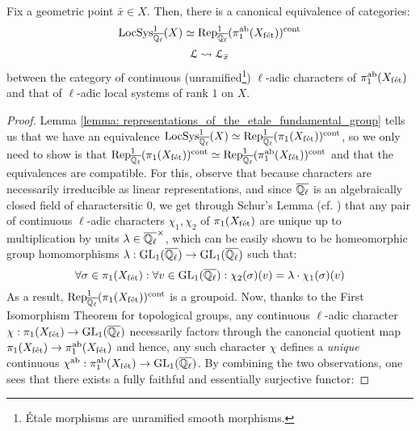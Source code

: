         \begin{theorem} \label{theorem: unramified_representations_are_sheaves_on_X}
            Fix a geometric point $\bar{x} \in X$. Then, there is a canonical equivalence of categories:
                $$\mathrm{LocSys}^1_{\overline{\mathbb{Q}_{\ell}}}(X) \simeq \mathrm{Rep}^1_{\overline{\mathbb{Q}_{\ell}}}(\pi_1^{\mathrm{ab}}(X_{\mathrm{f\acute{e}t}}))^{\mathrm{cont}}$$
                $$\mathcal{L} \leadsto \mathcal{L}_{\bar{x}}$$
            between the category of continuous (unramified\footnote{\'Etale morphisms are unramified smooth morphisms.}) $\ell$-adic characters of $\pi_1^{\mathrm{ab}}(X_{\mathrm{f\acute{e}t}})$ and that of $\ell$-adic local systems of rank $1$ on $X$.
        \end{theorem}
            \begin{proof}
                Lemma \ref{lemma: representations_of_the_etale_fundamental_group} tells us that we have an equivalence $\mathrm{LocSys}^1_{\overline{\mathbb{Q}_{\ell}}}(X) \simeq \mathrm{Rep}^1_{\overline{\mathbb{Q}_{\ell}}}(\pi_1(X_{\mathrm{f\acute{e}t}}))^{\mathrm{cont}}$, so we only need to show is that $\mathrm{Rep}^1_{\overline{\mathbb{Q}_{\ell}}}(\pi_1(X_{\mathrm{f\acute{e}t}}))^{\mathrm{cont}} \simeq \mathrm{Rep}^1_{\overline{\mathbb{Q}_{\ell}}}(\pi_1^{\mathrm{ab}}(X_{\mathrm{f\acute{e}t}}))^{\mathrm{cont}}$ and that the equivalences are compatible. For this, observe that because characters are necessarily irreducible as linear representations, and since $\overline{\mathbb{Q}_{\ell}}$ is an algebraically closed field of charactersitic $0$, we get through Schur's Lemma (cf. \cite[Lemma 3.6, pp. 35]{lam_first_course_in_noncommutative_rings}) that any pair of continuous $\ell$-adic characters $\chi_1, \chi_2$ of $\pi_1(X_{\mathrm{f\acute{e}t}})$ are unique up to multiplication by units $\lambda \in \overline{\Q_{\ell}}^{\x}$, which can be easily shown to be homeomorphic group homomorphisms $\lambda: \operatorname{GL}_1(\overline{\mathbb{Q}_{\ell}}) \to \operatorname{GL}_1(\overline{\mathbb{Q}_{\ell}})$ such that:
                    $$\forall \sigma \in \pi_1(X_{\mathrm{f\acute{e}t}}): \forall v \in \operatorname{GL}_1(\overline{\mathbb{Q}_{\ell}}): \chi_2(\sigma)(v) = \lambda \cdot \chi_1(\sigma)(v)$$
                As a result, $\mathrm{Rep}^1_{\overline{\mathbb{Q}_{\ell}}}(\pi_1(X_{\mathrm{f\acute{e}t}}))^{\mathrm{cont}}$ is a groupoid. Now, thanks to the First Isomorphism Theorem for topological groups, any continuous $\ell$-adic character $\chi: \pi_1(X_{\mathrm{f\acute{e}t}}) \to \operatorname{GL}_1(\overline{\mathbb{Q}_{\ell}})$ necessarily factors through the canoncial quotient map $\pi_1(X_{\mathrm{f\acute{e}t}}) \to \pi_1^{\mathrm{ab}}(X_{\mathrm{f\acute{e}t}})$ and hence, any such character $\chi$ defines a \textit{unique} continuous  $\chi^{\mathrm{ab}}: \pi_1^{\mathrm{ab}}(X_{\mathrm{f\acute{e}t}}) \to \operatorname{GL}_1(\overline{\mathbb{Q}_{\ell}})$. By combining the two observations, one sees that there exists a fully faithful and essentially surjective functor:

\end{proof}

